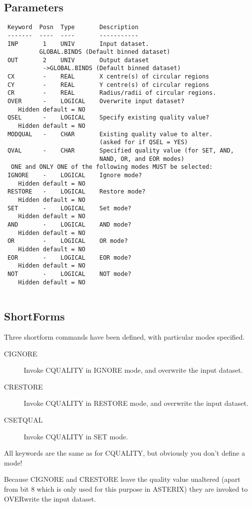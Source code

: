 \documentclass{book}
\renewcommand{\_}{{\tt\char'137}}     %
\begin{document}
\subsection{Parameters}
\begin{verbatim}
 Keyword  Posn  Type       Description
 -------  ----  ----       -----------
 INP       1    UNIV       Input dataset.
          GLOBAL.BINDS (Default binned dataset)
 OUT       2    UNIV       Output dataset
           ->GLOBAL.BINDS (Default binned dataset)
 CX        -    REAL       X centre(s) of circular regions
 CY        -    REAL       Y centre(s) of circular regions
 CR        -    REAL       Radius/radii of circular regions.
 OVER      -    LOGICAL    Overwrite input dataset?
    Hidden default = NO
 QSEL      -    LOGICAL    Specify existing quality value?
    Hidden default = NO
 MODQUAL   -    CHAR       Existing quality value to alter.
                           (asked for if QSEL = YES)
 QVAL      -    CHAR       Specified quality value (for SET, AND,
                           NAND, OR, and EOR modes)
  ONE and ONLY ONE of the following modes MUST be selected:
 IGNORE    -    LOGICAL    Ignore mode?
    Hidden default = NO
 RESTORE   -    LOGICAL    Restore mode?
    Hidden default = NO
 SET       -    LOGICAL    Set mode?
    Hidden default = NO
 AND       -    LOGICAL    AND mode?
    Hidden default = NO
 OR        -    LOGICAL    OR mode?
    Hidden default = NO
 EOR       -    LOGICAL    EOR mode?
    Hidden default = NO
 NOT       -    LOGICAL    NOT mode?
    Hidden default = NO
 
\end{verbatim}\subsection{ShortForms}
Three shortform commands have been defined, with particular
modes specified.
 
\begin{description}
\item[CIGNORE]
Invoke CQUALITY in IGNORE mode, and
overwrite the input dataset.
\item[CRESTORE]
Invoke CQUALITY in RESTORE mode, and
overwrite the input dataset.
\item[CSETQUAL]
Invoke CQUALITY in SET mode.
\end{description}
All keywords are the same as for CQUALITY, but obviously you don't
define a mode!
 
Because CIGNORE and CRESTORE leave the quality value unaltered (apart
from bit 8 which is only used for this purpose in ASTERIX) they are
invoked to OVERwrite the input dataset.
 
\end{document}
